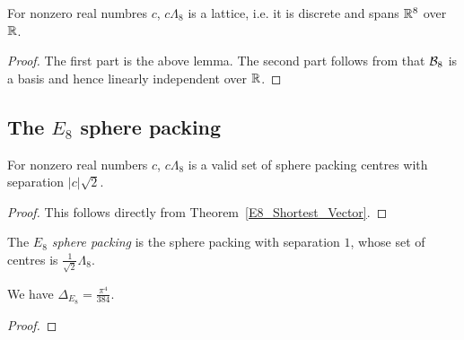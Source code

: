 \begin{lemma}\label{instLatticeE8}\leanok
  For nonzero real numbres $c$, $c\Lambda_8$ is a lattice, i.e. it is discrete and spans $\mathbb{R}^8$ over $\mathbb{R}$.
\end{lemma}
\begin{proof}\leanok
  The first part is the above lemma. The second part follows from that $\mathcal{B}_8$ is a basis and hence linearly independent over $\mathbb{R}$.
\end{proof}


\subsection{The $E_8$ sphere packing}

\begin{lemma}\label{instSpherePackingE8ScaledLattice}\leanok
  For nonzero real numbers $c$, $c\Lambda_8$ is a valid set of sphere packing centres with separation $|c|\sqrt{2}$.
\end{lemma}
\begin{proof}
  This follows directly from Theorem~\ref{E8_Shortest_Vector}.
\end{proof}

\begin{definition}\label{E8Packing}\leanok
  The \emph{$E_8$ sphere packing} is the sphere packing with separation $1$, whose set of centres is $\frac{1}{\sqrt{2}}\Lambda_8$.
\end{definition}

\begin{theorem}\label{E8Packing_density}
  We have $\Delta_{E_8} = \frac{\pi^4}{384}$.
\end{theorem}
\begin{proof}
\end{proof}

